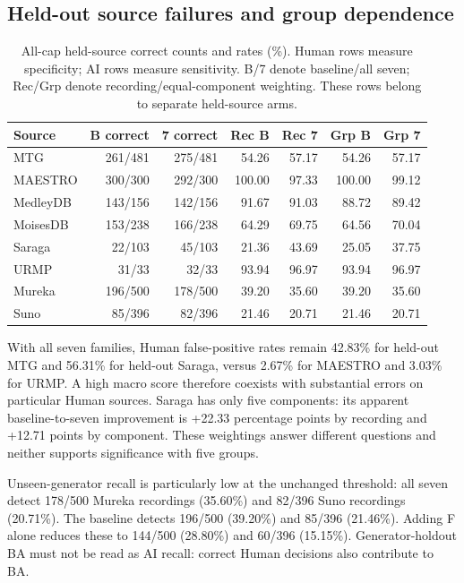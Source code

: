 \subsection{Held-out source failures and group dependence}

\begin{table}[htbp]
\centering\small
\begin{tabular}{@{}lrrrrrr@{}}
\toprule
Source & B correct & 7 correct & Rec B & Rec 7 & Grp B & Grp 7 \\
\midrule
MTG & 261/481 & 275/481 & 54.26 & 57.17 & 54.26 & 57.17 \\
MAESTRO & 300/300 & 292/300 & 100.00 & 97.33 & 100.00 & 99.12 \\
MedleyDB & 143/156 & 142/156 & 91.67 & 91.03 & 88.72 & 89.42 \\
MoisesDB & 153/238 & 166/238 & 64.29 & 69.75 & 64.56 & 70.04 \\
Saraga & 22/103 & 45/103 & 21.36 & 43.69 & 25.05 & 37.75 \\
URMP & 31/33 & 32/33 & 93.94 & 96.97 & 93.94 & 96.97 \\
Mureka & 196/500 & 178/500 & 39.20 & 35.60 & 39.20 & 35.60 \\
Suno & 85/396 & 82/396 & 21.46 & 20.71 & 21.46 & 20.71 \\
\bottomrule
\end{tabular}
\caption{All-cap held-source correct counts and rates (\%). Human rows measure specificity; AI rows measure sensitivity. B/7 denote baseline/all seven; Rec/Grp denote recording/equal-component weighting. These rows belong to separate held-source arms.}
\end{table}

With all seven families, Human false-positive rates remain 42.83\% for held-out MTG and 56.31\% for held-out Saraga, versus 2.67\% for MAESTRO and 3.03\% for URMP. A high macro score therefore coexists with substantial errors on particular Human sources. Saraga has only five components: its apparent baseline-to-seven improvement is +22.33 percentage points by recording and +12.71 points by component. These weightings answer different questions and neither supports significance with five groups.

Unseen-generator recall is particularly low at the unchanged threshold: all seven detect 178/500 Mureka recordings (35.60\%) and 82/396 Suno recordings (20.71\%). The baseline detects 196/500 (39.20\%) and 85/396 (21.46\%). Adding F alone reduces these to 144/500 (28.80\%) and 60/396 (15.15\%). Generator-holdout BA must not be read as AI recall: correct Human decisions also contribute to BA.

